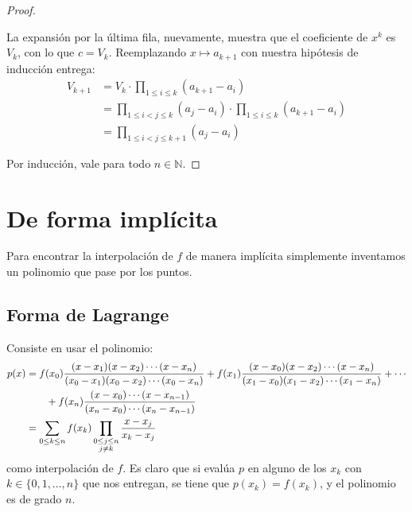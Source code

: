 \begin{proof}
\begin{description}
      La expansión por la última fila,
      nuevamente,
      muestra que el coeficiente de \(x^k\) es \(V_k\),
      con lo que \(c = V_k\).
      Reemplazando \(x \mapsto a_{k + 1}\)
      con nuestra hipótesis de inducción entrega:
      \begin{align*}
        V_{k + 1}
          &= V_k \cdot \prod_{1 \le i \le k} (a_{k + 1} - a_i) \\
          &= \prod_{1 \le i < j \le k} (a_j - a_i)
               \cdot \prod_{1 \le i \le k} (a_{k + 1} - a_i) \\
          &= \prod_{1 \le i < j \le k + 1} (a_j - a_i)
      \end{align*}
    \end{description}
    Por inducción, vale para todo \(n \in \mathbb{N}\).
  \end{proof}

\section{De forma implícita}

  Para encontrar la interpolación de \(f\) de manera implícita
  simplemente inventamos un polinomio que pase por los puntos.

\subsection{Forma de Lagrange}

  Consiste en usar el polinomio:
  \begin{align}
    p(x)
      &= f(x_0) \frac{(x - x_1) (x - x_2) \dotsm (x - x_n)}
                     {(x_0 - x_1) (x_0 - x_2) \dotsm (x_0 - x_n)}
           + f(x_1) \frac{(x -x_0) (x - x_2) \dotsm (x - x_n)}
                         {(x_1 - x_0) (x_1 - x_2) \dotsm (x_1 - x_n)}
           + \dotsb \notag \\
      & \qquad {} + f(x_n) \frac{(x - x_0) \dotsm (x - x_{n - 1})}
                               {(x_n - x_0) \dotsm (x_n - x_{n - 1})}
              \notag \\
     &= \sum_{0 \le k \le n} f(x_k)
          \prod_{\substack{0 \le j \le n \\ j \ne k}}
            \frac{x - x_j}{x_k - x_j}
              \label{04::Lagrange:2}
  \end{align}
  como interpolación de \(f\).
  Es claro que si evalúa \(p\)
  en alguno de los \(x_k\) con \(k \in \{ 0, 1, \dotsc, n\}\) que nos entregan,
  se tiene que \(p(x_k) = f(x_k)\),
  y el polinomio es de grado \(n\).


